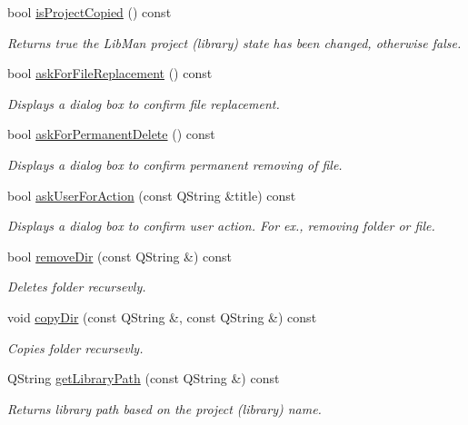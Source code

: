 \begin{DoxyCompactItemize}
bool \hyperlink{classMainWindow_a35f6e8e6d58371d363fcb7fc199e86ba}{is\-Project\-Copied} () const 
\begin{DoxyCompactList}\small\item\em Returns true the Lib\-Man project (library) state has been changed, otherwise false. \end{DoxyCompactList}\item 
bool \hyperlink{classMainWindow_a6cc24c7cd36704cdf570e26b5621fc66}{ask\-For\-File\-Replacement} () const 
\begin{DoxyCompactList}\small\item\em Displays a dialog box to confirm file replacement. \end{DoxyCompactList}\item 
bool \hyperlink{classMainWindow_afbea101d81d3423e32bcd200f6dd7c39}{ask\-For\-Permanent\-Delete} () const 
\begin{DoxyCompactList}\small\item\em Displays a dialog box to confirm permanent removing of file. \end{DoxyCompactList}\item 
bool \hyperlink{classMainWindow_a380a7f848e6a3b97d21d94643e02c046}{ask\-User\-For\-Action} (const Q\-String \&title) const 
\begin{DoxyCompactList}\small\item\em Displays a dialog box to confirm user action. For ex., removing folder or file. \end{DoxyCompactList}\item 
bool \hyperlink{classMainWindow_a488161a7ea31be35bf87091772c5a235}{remove\-Dir} (const Q\-String \&) const 
\begin{DoxyCompactList}\small\item\em Deletes folder recursevly. \end{DoxyCompactList}\item 
void \hyperlink{classMainWindow_a9a8e06194b0035c089c872646b5cb4b6}{copy\-Dir} (const Q\-String \&, const Q\-String \&) const 
\begin{DoxyCompactList}\small\item\em Copies folder recursevly. \end{DoxyCompactList}\item 
Q\-String \hyperlink{classMainWindow_aa4dfdf9b2b26f558e0edcd10604d7607}{get\-Library\-Path} (const Q\-String \&) const 
\begin{DoxyCompactList}\small\item\em Returns library path based on the project (library) name. \end{DoxyCompactList}\item 

\end{DoxyCompactItemize}
